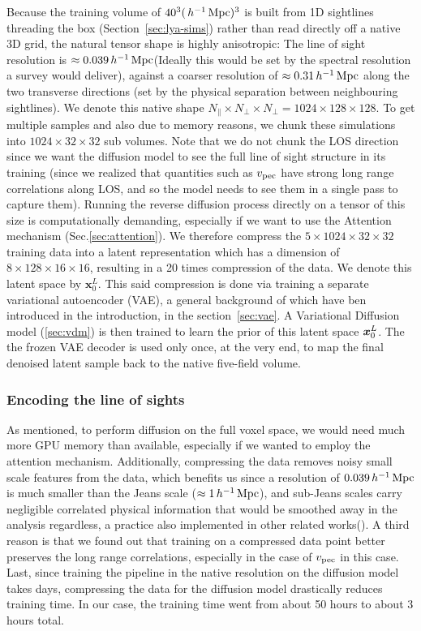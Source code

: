 Because the training volume of $40^3 (\,h^{-1}\,\mathrm{Mpc})^3$ is built from 1D sightlines threading the box (Section~\ref{sec:lya-sims}) rather than read directly off a native 3D grid, the natural tensor shape is highly anisotropic: The line of sight resolution is $\approx0.039\,h^{-1}\,\mathrm{Mpc}$(Ideally this would be set by the spectral resolution a survey would deliver), against a coarser resolution of $\approx0.31\,h^{-1}\,\mathrm{Mpc}$ along the two transverse directions (set by the physical separation between neighbouring sightlines). We denote this native shape $N_\parallel\times N_\perp\times N_\perp = 1024\times128\times128$. To get multiple samples and also due to memory reasons, we chunk these simulations into $1024\times32\times32$ sub volumes. Note that we do not chunk the LOS direction since we want the diffusion model to see the full line of sight structure in its training (since we realized that quantities such as $v_{\rm pec}$ have strong long range correlations along LOS, and so the model needs to see them in a single pass to capture them). Running the reverse diffusion process directly on a tensor of this size is computationally demanding, especially if we want to use the Attention mechanism (Sec.\ref{sec:attention}). We therefore compress the $5\times1024\times32\times32$ training data into a latent representation which has a dimension of $8\times128\times16\times16$, resulting in a 20 times compression of the data. We denote this latent space by $\bm{x}_0^L$. This said compression is done via training a separate variational autoencoder (VAE), a general background of which have ben introduced in the introduction, in the section~\ref{sec:vae}. A Variational Diffusion model (\ref{sec:vdm}) is then trained to learn the prior of this latent space $\bm{x}_0^L$. The the frozen VAE decoder is used only once, at the very end, to map the final denoised latent sample back to the native five-field volume.

\subsubsection{Encoding the line of sights}
\label{sec:VAE}

As mentioned, to perform diffusion on the full voxel space, we would need much more GPU memory than available, especially if we wanted to employ the attention mechanism. Additionally, compressing the data removes noisy small scale features from the data, which benefits us since a resolution of $0.039\,h^{-1}\,\mathrm{Mpc}$ is much smaller than the Jeans scale ($\approx1\,h^{-1}\,\mathrm{Mpc}$), and sub-Jeans scales carry negligible correlated physical information that would be smoothed away in the analysis regardless, a practice also implemented in other related works(\citet{Maitra_2026}). A third reason is that we found out that training on a compressed data point better preserves the long range correlations, especially in the case of $v_{\rm pec}$ in this case. Last, since training the pipeline in the native resolution on the diffusion model takes days, compressing the data for the diffusion model drastically reduces training time. In our case, the training time went from about 50 hours to about 3 hours total.
\vspace{\baselineskip}

